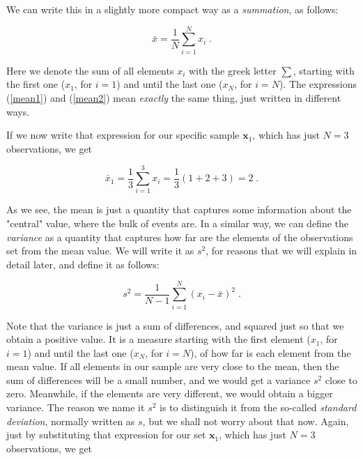 \documentclass{book}
\begin{document}
We can write this in a slightly more compact way as a \textit{summation}, as follows:

\begin{equation}
\bar{x} = \frac{1}{N} \sum_{i = 1}^{N} x_{i} \; .
\label{mean2}
\end{equation}

Here we denote the sum of all elements $x_{i}$ with the greek letter $\sum$, starting with the first one ($x_1$, for $i = 1$) and until the last one ($x_N$, for $i = N$). The expressions (\ref{mean1}) and (\ref{mean2}) mean \textit{exactly} the same thing, just written in different ways.

\medskip

If we now write that expression for our specific sample $\textbf{x}_{1}$, which has just $N = 3$ observations, we get

\begin{equation}
\bar{x}_{1} = \frac{1}{3} \sum_{i = 1}^{3} x_{i} = \frac{1}{3} (1 + 2 + 3) = 2 \; . \nonumber
\end{equation}

As we see, the mean is just a quantity that captures some information about the "central" value, where the bulk of events are. In a similar way, we can define the \textit{variance} as a quantity that captures how far are the elements of the observations set from the mean value. We will write it as $s^2$, for reasons that we will explain in detail later, and define it as follows:

\begin{equation}
s^2 = \frac{1}{N - 1} \sum_{i = 1}^{N} (x_{i} - \bar{x})^{2} \; . 
\end{equation}

Note that the variance is just a sum of differences, and squared just so that we obtain a positive value. It is a measure starting with the first element ($x_1$, for $i = 1$) and until the last one ($x_N$, for $i = N$), of how far is each element from the mean value. If all elements in our sample are very close to the mean, then the sum of differences will be a small number, and we would get a variance $s^2$ close to zero. Meanwhile, if the elements are very different, we would obtain a bigger variance. The reason we name it $s^2$ is to distinguish it from the so-called \textit{standard deviation}, normally written as $s$, but we shall not worry about that now. Again, just by substituting that expression for our set $\textbf{x}_1$, which has just $N = 3$ observations, we get
\end{document}
